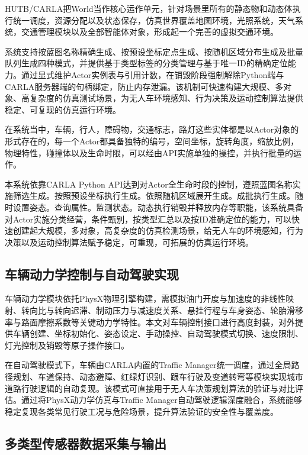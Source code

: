 HUTB/CARLA把World当作核心运作单元，针对场景里所有的静态物和动态体执行统一调度，资源分配以及状态保存，仿真世界覆盖地图环境，光照系统，天气系统，交通管理模块以及全部智能体对象，形成起一个完善的虚拟交通环境。

系统支持按蓝图名称精确生成、按预设坐标定点生成、按随机区域分布生成及批量队列生成四种模式，并提供基于类型标签的分类管理与基于唯一ID的精确定位能力。通过显式维护Actor实例表与引用计数，在销毁阶段强制解除Python端与CARLA服务器端的句柄绑定，防止内存泄漏。该机制可快速构建大规模、多对象、高复杂度的仿真测试场景，为无人车环境感知、行为决策及运动控制算法提供稳定、可复现的仿真运行环境。

在系统当中，车辆，行人，障碍物，交通标志，路灯这些实体都是以Actor对象的形式存在的，每一个Actor都具备独特的编号，空间坐标，旋转角度，缩放比例，物理特性，碰撞体以及生命时限，可以经由API实施单独的操控，并执行批量的运作。

本系统依靠CARLA Python
API达到对Actor全生命时段的控制，遵照蓝图名称实施筛选生成。按照预设坐标执行生成。依照随机区域展开生成。成批执行生成。随时设置姿态。查询属性。监测状态。动态执行销毁并释放内存等职能，该系统具备对Actor实施分类经营，条件甄别，按类型汇总以及按ID准确定位的能力，可以快速创建起大规模，多对象，高复杂度的仿真检测场景，给无人车的环境感知，行为决策以及运动控制算法赋予稳定，可重现，可拓展的仿真运行环境。

\subsection{车辆动力学控制与自动驾驶实现}

车辆动力学模块依托PhysX物理引擎构建，需模拟油门开度与加速度的非线性映射、转向比与转向迟滞、制动压力与减速度关系、悬挂行程与车身姿态、轮胎滑移率与路面摩擦系数等关键动力学特性。本文对车辆控制接口进行高度封装，对外提供车辆创建、坐标初始化、姿态设定、手动操控、自动驾驶模式切换、速度限制、灯光控制及销毁等原子操作接口。

在自动驾驶模式下，车辆由CARLA内置的Traffic
Manager统一调度，通过全局路径规划、车道保持、动态避障、红绿灯识别、跟车行驶及变道转弯等模块实现城市道路行驶逻辑的自动复现。该模式可直接用于无人车决策规划算法的验证与对比评估。通过将PhysX动力学仿真与Traffic
Manager自动驾驶逻辑深度融合，系统能够稳定复现各类常见行驶工况与危险场景，提升算法验证的安全性与覆盖度。

\subsection{多类型传感器数据采集与输出}

